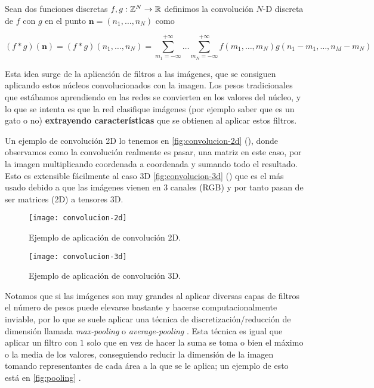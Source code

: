 \begin{definicion}
  Sean dos funciones discretas $f, g : \mathbb{Z}^N \to \mathbb{R}$ definimos la convolución $N$-D discreta de $f$ con $g$ en el punto $\textbf{n} = (n_1, \ldots, n_N)$ como

  $$(f * g)(\textbf{n}) = (f * g)(n_1, \ldots, n_N) = \sum \limits^{+\infty}_{m_1 = -\infty} \ldots \sum^{+\infty}_{m_N = -\infty} f(m_1, \ldots, m_N)g(n_1 - m_1, \ldots, n_M - m_N)$$
  \label{def:convolucion}
\end{definicion}

Esta idea surge de la aplicación de filtros a las imágenes, que se consiguen aplicando estos núcleos convolucionados con la imagen. Los pesos tradicionales que estábamos aprendiendo en las redes se convierten en los valores del núcleo, y lo que se intenta es que la red clasifique imágenes (por ejemplo saber que es un gato o no) \textbf{extrayendo características} que se obtienen al aplicar estos filtros.

Un ejemplo de convolución 2D lo tenemos en \autoref{fig:convolucion-2d} (\cite{pelatrion2020conv}), donde observamos como la convolución realmente es pasar, una matriz en este caso, por la imagen multiplicando coordenada a coordenada y sumando todo el resultado. Esto es extensible fácilmente al caso 3D \autoref{fig:convolucion-3d} (\cite{bansal2018conv}) que es el más usado debido a que las imágenes vienen en 3 canales (RGB) y por tanto pasan de ser matrices (2D) a tensores 3D.

\begin{figure}[htpb]
  \centering
  \texttt{[image: convolucion-2d]}
  \caption{Ejemplo de aplicación de convolución 2D.}
  \label{fig:convolucion-2d}
\end{figure}

\begin{figure}[htpb]
  \centering
  \texttt{[image: convolucion-3d]}
  \caption{Ejemplo de aplicación de convolución 3D.}
  \label{fig:convolucion-3d}
\end{figure}

Notamos que si las imágenes son muy grandes al aplicar diversas capas de filtros el número de pesos puede elevarse bastante y hacerse computacionalmente inviable, por lo que se suele aplicar una técnica de discretización/reducción de dimensión llamada \emph{max-pooling} o \emph{average-pooling }\cite{graham2014fractional}. Esta técnica es igual que aplicar un filtro con $1$ solo que en vez de hacer la suma se toma o bien el máximo o la media de los valores, conseguiendo reducir la dimensión de la imagen tomando representantes de cada área a la que se le aplica; un ejemplo de esto está en \autoref{fig:pooling} \cite{yani2019application}.

